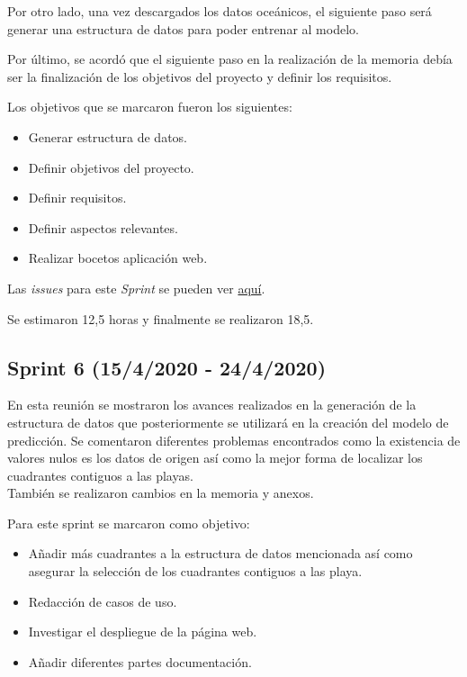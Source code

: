 Por otro lado, una vez descargados los datos oceánicos, el siguiente paso será generar una estructura de datos para poder entrenar al modelo.

Por último, se acordó que el siguiente paso en la realización de la memoria debía ser la finalización de los objetivos del proyecto y definir los requisitos.

Los objetivos que se marcaron fueron los siguientes:
\begin{itemize}
	\item Generar estructura de datos.
	\item Definir objetivos del proyecto.
	\item Definir requisitos.
	\item Definir aspectos relevantes.
	\item Realizar bocetos aplicación web.
\end{itemize}

Las \emph{issues} para este \emph{Sprint} se pueden ver \href{https://github.com/psnti/TFG-Pablo-Santidrian-Tudanca/milestone/5}{aquí}.


Se estimaron 12,5 horas y finalmente se realizaron 18,5.

\subsection{Sprint 6 (15/4/2020 - 24/4/2020)}\label{Sprint-6}

En esta reunión se mostraron los avances realizados en la generación de la estructura de datos que posteriormente se utilizará en la creación del modelo de predicción. Se comentaron diferentes problemas encontrados como la existencia de valores nulos es los datos de origen así como la mejor forma de localizar los cuadrantes contiguos a las playas.\\
También se realizaron cambios en la memoria y anexos.

Para este sprint se marcaron como objetivo:
\begin{itemize}
	\item Añadir más cuadrantes a la estructura de datos mencionada así como asegurar la selección de los cuadrantes contiguos a las playa.
	\item Redacción de casos de uso.
	\item Investigar el despliegue de la página web.
	\item Añadir diferentes partes  documentación.
\end{itemize} 

